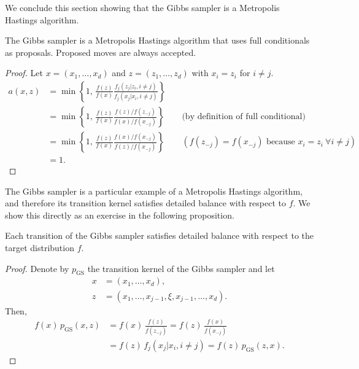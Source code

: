 We conclude this section showing that the Gibbs sampler is a Metropolis Hastings algorithm.

\begin{theorem}
\label{thm:5.4}
The Gibbs sampler is a Metropolis Hastings algorithm that uses full conditionals as proposals.
Proposed moves are always accepted.
\end{theorem}

\begin{proof}
Let $x = (x_1, \ldots, x_d)$ and $z = (z_1, \ldots, z_d)$ with $x_i = z_i$ for $i \neq j$.
\begin{align*}
  a(x, z)
  &= \min\!\left\{1,\, \frac{f(z)}{f(x)}\frac{f_j(z_j | z_i, i \neq j)}{f_j(x_j | x_i, i \neq j)}\right\}\\
  &= \min\!\left\{1,\, \frac{f(z)}{f(x)}\frac{f(z)/f(z_{-j})}{f(x)/f(x_{-j})}\right\}
    \qquad\text{(by definition of full conditional)}\\
  &= \min\!\left\{1,\, \frac{f(z)}{f(x)}\frac{f(x)/f(x_{-j})}{f(z)/f(x_{-j})}\right\}
    \qquad(f(z_{-j}) = f(x_{-j}) \text{ because } x_i = z_i\ \forall i \neq j)\\
  &= 1.
\end{align*}
\end{proof}

The Gibbs sampler is a particular example of a Metropolis Hastings algorithm, and therefore its
transition kernel satisfies detailed balance with respect to $f$. We show this directly as an
exercise in the following proposition.

\begin{proposition}
\label{prop:5.5}
Each transition of the Gibbs sampler satisfies detailed balance with respect to the target
distribution $f$.
\end{proposition}

\begin{proof}
Denote by $p_{\mathrm{GS}}$ the transition kernel of the Gibbs sampler and let
\begin{align*}
  x &= (x_1, \ldots, x_d),\\
  z &= (x_1, \ldots, x_{j-1}, \xi, x_{j-1}, \ldots, x_d).
\end{align*}
Then,
\begin{align*}
  f(x)\,p_{\mathrm{GS}}(x, z)
  &= f(x)\,\frac{f(z)}{f(z_{-j})}
   = f(z)\,\frac{f(x)}{f(x_{-j})}\\
  &= f(z)\,f_j(x_j | x_i, i \neq j)
   = f(z)\,p_{\mathrm{GS}}(z, x).
\end{align*}
\end{proof}

